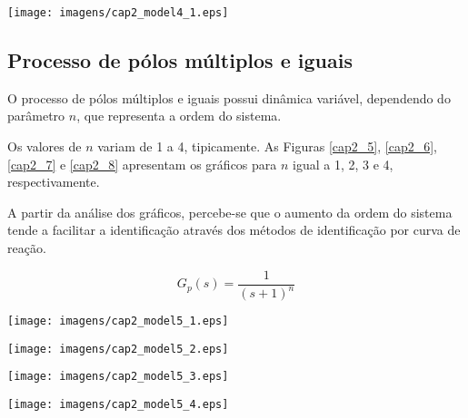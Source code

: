     \begin{center}
        \texttt{[image: imagens/cap2\_model4\_1.eps]}
        \label{cap2_4}
    \end{center}

\subsection{Processo de pólos múltiplos e iguais}

    O processo de pólos múltiplos e iguais possui dinâmica variável, dependendo
    do parâmetro $n$, que representa a ordem do sistema.
    
    Os valores de $n$ variam de 1 a 4, tipicamente. As Figuras \ref{cap2_5},
    \ref{cap2_6}, \ref{cap2_7} e \ref{cap2_8} apresentam os gráficos para
    $n$ igual a 1, 2, 3 e 4, respectivamente.
    
    A partir da análise dos gráficos, percebe-se que o aumento da ordem do sistema
    tende a facilitar a identificação através dos métodos de identificação por
    curva de reação.
    
    \begin{equation}
        G_p(s) = \frac{1}{(s+1)^n}
    \end{equation}

    \begin{center}
        \texttt{[image: imagens/cap2\_model5\_1.eps]}
        \label{cap2_5}
    \end{center}
    
    \begin{center}
        \texttt{[image: imagens/cap2\_model5\_2.eps]}
        \label{cap2_6}
    \end{center}
    
    \begin{center}
        \texttt{[image: imagens/cap2\_model5\_3.eps]}
        \label{cap2_7}
    \end{center}
    
    \begin{center}
        \texttt{[image: imagens/cap2\_model5\_4.eps]}
        \label{cap2_8}
    \end{center}

